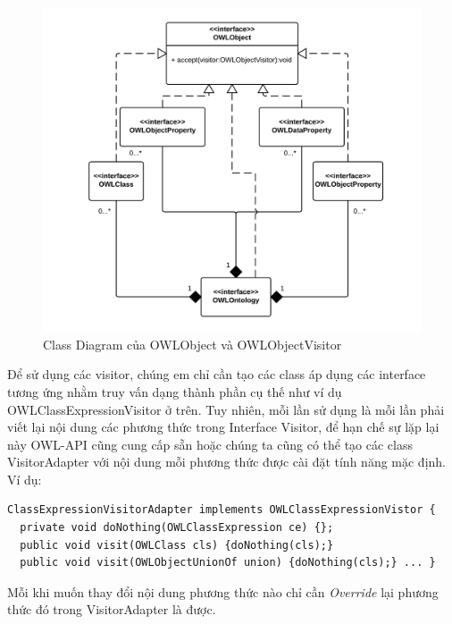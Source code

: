 {\begin{figure}[h!]
	\centering
	\includegraphics[width=145mm]{Figures/uml_classdiagram_owlobject_forvisitor_nobackground.png}
	\caption{Class Diagram của OWLObject và OWLObjectVisitor \label{overflow}}
\end{figure}
Để sử dụng các visitor, chúng em chỉ cần tạo các class áp dụng các interface tương ứng nhằm truy vấn dạng thành phần cụ thế như ví dụ OWLClassExpressionVisitor ở trên. Tuy nhiên, mỗi lần sử dụng là mỗi lần phải viết lại nội dung các phương thức trong Interface Visitor, để hạn chế sự lặp lại này OWL-API cũng cung cấp sẵn hoặc chúng ta cũng có thể tạo các class VisitorAdapter với nội dung mỗi phương thức được cài đặt tính năng mặc định. Ví dụ:
\begin{verbatim}
ClassExpressionVisitorAdapter implements OWLClassExpressionVistor {
  private void doNothing(OWLClassExpression ce) {};
  public void visit(OWLClass cls) {doNothing(cls);}
  public void visit(OWLObjectUnionOf union) {doNothing(cls);} ... }
\end{verbatim}
Mỗi khi muốn thay đổi nội dung phương thức nào chỉ cần \textit{Override} lại phương thức đó trong VisitorAdapter là được.
}
